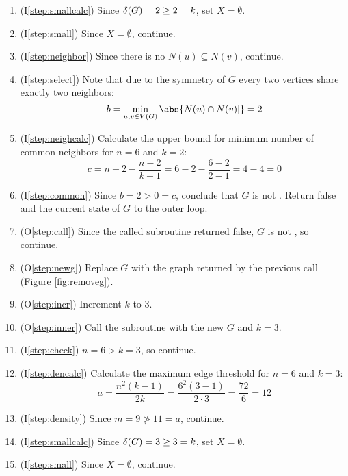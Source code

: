 \begin{enumerate}
\item (I\ref{step:smallcalc}) Since \(\delta(G)=2\ge2=k\), set \(X=\emptyset\).

\item (I\ref{step:small}) Since \(X=\emptyset\), continue.

\item (I\ref{step:neighbor}) Since there is no \(N(u)\subseteq N(v)\), continue.

\item (I\ref{step:select}) Note that due to the symmetry of \(G\) every two vertices share exactly two neighbors:
  \[b=\min_{u,v\in V(G)}\abs{N(u)\cap N(v)]}=2\]

\item (I\ref{step:neighcalc}) Calculate the upper bound for minimum number of common neighbors for \(n=6\) and
  \(k=2\):
  \[c=n-2-\frac{n-2}{k-1}=6-2-\frac{6-2}{2-1}=4-4=0\]

\item (I\ref{step:common}) Since \(b=2>0=c\), conclude that \(G\) is not .  Return false and the current
  state of \(G\) to the outer loop.

\item (O\ref{step:call}) Since the called subroutine returned false, \(G\) is not , so continue.

\item (O\ref{step:newg}) Replace \(G\) with the graph returned by the previous call (Figure \ref{fig:removeg}).

\item (O\ref{step:incr}) Increment \(k\) to 3.

\item (O\ref{step:inner}) Call the subroutine with the new \(G\) and \(k=3\).
  
\item (I\ref{step:check}) \(n=6>k=3\), so continue.

\item (I\ref{step:dencalc}) Calculate the maximum edge threshold for \(n=6\) and \(k=3\):
  \[a=\frac{n^2(k-1)}{2k}=\frac{6^2(3-1)}{2\cdot3}=\frac{72}{6}=12\]

\item (I\ref{step:density}) Since \(m=9\ngtr11=a\), continue.

\item (I\ref{step:smallcalc}) Since \(\delta(G)=3\ge3=k\), set \(X=\emptyset\).

\item (I\ref{step:small}) Since \(X=\emptyset\), continue.


\end{enumerate}
